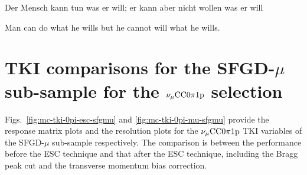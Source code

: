  \begin{savequote}[8cm]
Der Mensch kann tun was er will; er kann aber nicht wollen was er will

Man can do what he wills but he cannot will what he wills.
\end{savequote}

\chapter{\label{app:perf}TKI comparisons for the SFGD-$\mu$ sub-sample for the $\nu_{\mu}\textrm{CC}0\pi1\textrm{p}$ selection}

\minitoc

\label{sec:app-tki-sfgd-mu}
Figs.~\ref{fig:mc-tki-0pi-esc-sfgmu} and \ref{fig:mc-tki-0pi-mu-sfgmu} provide the response matrix plots and the resolution plots for the $\nu_{\mu}\textrm{CC}0\pi1\textrm{p}$ TKI variables of the SFGD-$\mu$ sub-sample respectively.
The comparison is between the performance before the ESC technique and that after the ESC technique, including the Bragg peak cut and the transverse momentum bias correction.
